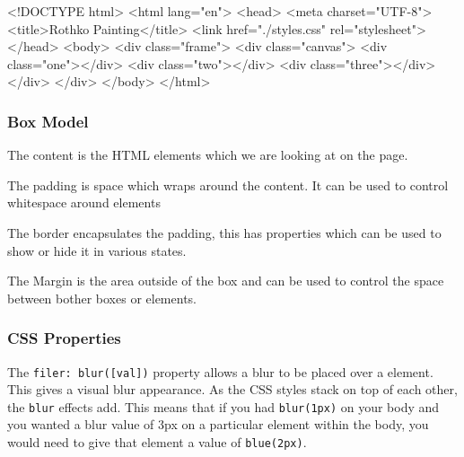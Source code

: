 \begin{html}
<!DOCTYPE html>
<html lang="en">
  <head>
    <meta charset="UTF-8">
    <title>Rothko Painting</title>
    <link href="./styles.css" rel="stylesheet">
  </head>
  <body>
    <div class="frame">
      <div class="canvas">
        <div class="one"></div>
        <div class="two"></div>
        <div class="three"></div>
      </div>
    </div>
  </body>
</html>
\end{html}

\subsubsection{Box Model}
The content is the HTML elements which we are looking at on the page.

The padding is space which wraps around the content. It can be used to control whitespace around elements

The border encapsulates the padding, this has properties which can be used to show or hide it in various states.

The Margin is the area outside of the box and can be used to control the space between bother boxes or elements.

\subsubsection{CSS Properties}
The \texttt{filer: blur([val])} property allows a blur to be placed over a element. This gives a visual blur appearance. As the CSS styles stack on top of each other, the \texttt{blur} effects add. This means that if you had \texttt{blur(1px)} on your body and you wanted a blur value of 3px on a particular element within the body, you would need to give that element a value of \texttt{blue(2px)}.

